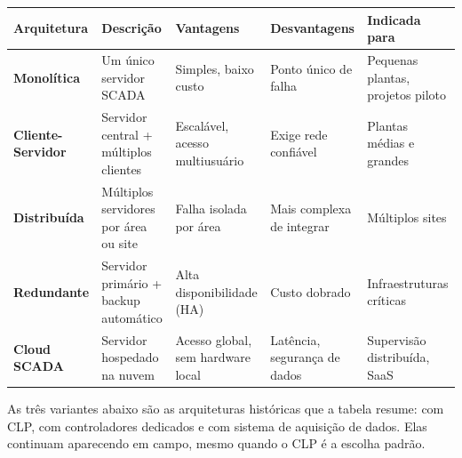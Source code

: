 \begin{longtable}[]{@{}
  >{\raggedright\arraybackslash}p{}
  >{\raggedright\arraybackslash}p{}
  >{\raggedright\arraybackslash}p{}
  >{\raggedright\arraybackslash}p{}
  >{\raggedright\arraybackslash}p{}@{}}
\toprule\noalign{}
\begin{minipage}[b]{\linewidth}\raggedright
Arquitetura
\end{minipage} & \begin{minipage}[b]{\linewidth}\raggedright
Descrição
\end{minipage} & \begin{minipage}[b]{\linewidth}\raggedright
Vantagens
\end{minipage} & \begin{minipage}[b]{\linewidth}\raggedright
Desvantagens
\end{minipage} & \begin{minipage}[b]{\linewidth}\raggedright
Indicada para
\end{minipage} \\
\midrule\noalign{}
\endhead
\bottomrule\noalign{}
\endlastfoot
\textbf{Monolítica} & Um único servidor SCADA & Simples, baixo custo & Ponto único de falha & Pequenas plantas, projetos piloto \\
\textbf{Cliente-Servidor} & Servidor central + múltiplos clientes & Escalável, acesso multiusuário & Exige rede confiável & Plantas médias e grandes \\
\textbf{Distribuída} & Múltiplos servidores por área ou site & Falha isolada por área & Mais complexa de integrar & Múltiplos sites \\
\textbf{Redundante} & Servidor primário + backup automático & Alta disponibilidade (HA) & Custo dobrado & Infraestruturas críticas \\
\textbf{Cloud SCADA} & Servidor hospedado na nuvem & Acesso global, sem hardware local & Latência, segurança de dados & Supervisão distribuída, SaaS \\
\end{longtable}

As três variantes abaixo são as arquiteturas históricas que a tabela resume: com CLP, com
controladores dedicados e com sistema de aquisição de dados. Elas continuam aparecendo em campo,
mesmo quando o CLP é a escolha padrão.

